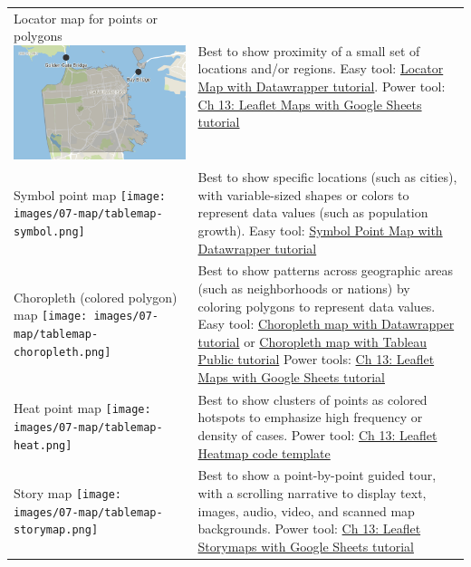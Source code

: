 \documentclass[
  english,
]{book}
\begin{document}
\begin{longtable}[]{@{}
  >{\raggedright\arraybackslash}p{}
  >{\raggedright\arraybackslash}p{}@{}}
Locator map for points or polygons \includegraphics{images/07-map/tablemap-locator.png} & Best to show proximity of a small set of locations and/or regions. Easy tool: \href{locatormap-datawrapper.html}{Locator Map with Datawrapper tutorial}. Power tool: \href{leaflet-maps-with-google-sheets.html}{Ch 13: Leaflet Maps with Google Sheets tutorial} \\
Symbol point map \texttt{[image: images/07-map/tablemap-symbol.png]} & Best to show specific locations (such as cities), with variable-sized shapes or colors to represent data values (such as population growth). Easy tool: \href{symbolmap-datawrapper.html}{Symbol Point Map with Datawrapper tutorial} \\
Choropleth (colored polygon) map \texttt{[image: images/07-map/tablemap-choropleth.png]} & Best to show patterns across geographic areas (such as neighborhoods or nations) by coloring polygons to represent data values. Easy tool: \href{choropleth-datawrapper.html}{Choropleth map with Datawrapper tutorial} or \href{map-tableau.html}{Choropleth map with Tableau Public tutorial} Power tools: \href{leaflet-maps-with-google-sheets.html}{Ch 13: Leaflet Maps with Google Sheets tutorial} \\
Heat point map \texttt{[image: images/07-map/tablemap-heat.png]} & Best to show clusters of points as colored hotspots to emphasize high frequency or density of cases. Power tool: \href{leaflet-heatmap.html}{Ch 13: Leaflet Heatmap code template} \\
Story map \texttt{[image: images/07-map/tablemap-storymap.png]} & Best to show a point-by-point guided tour, with a scrolling narrative to display text, images, audio, video, and scanned map backgrounds. Power tool: \href{leaflet-storymaps-with-google-sheets.html}{Ch 13: Leaflet Storymaps with Google Sheets tutorial} \\

\end{longtable}
\end{document}
